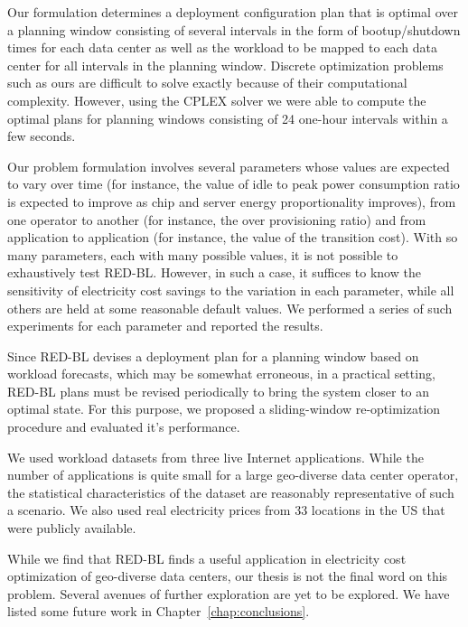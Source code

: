 Our formulation determines a deployment configuration plan that is optimal over a planning window consisting of several intervals in the form of bootup/shutdown times for each data center as well as the workload to be mapped to each data center for all intervals in the planning window. Discrete optimization problems such as ours are difficult to solve exactly because of their computational complexity. However, using the CPLEX solver we were able to compute the optimal plans for planning windows consisting of 24 one-hour intervals within a few seconds. 

Our problem formulation involves several parameters whose values are expected to vary over time (for instance, the value of idle to peak power consumption ratio is expected to improve as chip and server energy proportionality improves), from one operator to another (for instance, the over provisioning ratio) and from application to application (for instance, the value of the transition cost). With so many parameters, each with many possible values, it is not possible to exhaustively test RED-BL. However, in such a case, it suffices to know the sensitivity of electricity cost savings to the variation in each parameter, while all others are held at some reasonable default values. We performed a series of such experiments for each parameter and reported the results.

Since RED-BL devises a deployment plan for a planning window based on workload forecasts, which may be somewhat erroneous, in a practical setting, RED-BL plans must be revised periodically to bring the system closer to an optimal state. For this purpose, we proposed a sliding-window re-optimization procedure and evaluated it's performance.

We used workload datasets from three live Internet applications. While the number of applications is quite small for a large geo-diverse data center operator, the statistical characteristics of the dataset are reasonably representative of such a scenario. We also used real electricity prices from 33 locations in the US that were publicly available.

While we find that RED-BL finds a useful application in electricity cost optimization of geo-diverse data centers, our thesis is not the final word on this problem. Several avenues of further exploration are yet to be explored. We have listed some future work in Chapter~\ref{chap:conclusions}.